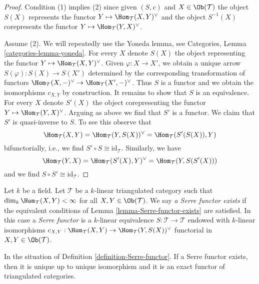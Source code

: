 \begin{proof}
Condition (1) implies (2) since given $(S, c)$ and $X \in \Ob(\mathcal{T})$
the object $S(X)$ represents the functor
$Y \mapsto \Hom_\mathcal{T}(X, Y)^\vee$ and the object $S^{-1}(X)$ corepresents
the functor $Y \mapsto \Hom_\mathcal{T}(Y, X)^\vee$.

\medskip\noindent
Assume (2). We will repeatedly use the Yoneda lemma, see
Categories, Lemma \ref{categories-lemma-yoneda}.
For every $X$ denote $S(X)$ the object representing the
functor $Y \mapsto \Hom_\mathcal{T}(X, Y)^\vee$. Given
$\varphi : X \to X'$, we obtain a unique arrow $S(\varphi) : S(X) \to S(X')$
determined by the corresponding transformation of functors
$\Hom_\mathcal{T}(X, -)^\vee \to \Hom_\mathcal{T}(X', -)^\vee$.
Thus $S$ is a functor and we obtain the isomorphisms $c_{X, Y}$
by construction. It remains to show that $S$ is an equivalence.
For every $X$ denote $S'(X)$ the object corepresenting the
functor $Y \mapsto \Hom_\mathcal{T}(Y, X)^\vee$. Arguing as
above we find that $S'$ is a functor. We claim that $S'$
is quasi-inverse to $S$. To see this observe that
$$
\Hom_\mathcal{T}(X, Y) = \Hom_\mathcal{T}(Y, S(X))^\vee =
\Hom_\mathcal{T}(S'(S(X)), Y)
$$
bifunctorially, i.e., we find $S' \circ S \cong \text{id}_\mathcal{T}$.
Similarly, we have
$$
\Hom_\mathcal{T}(Y, X) = \Hom_\mathcal{T}(S'(X), Y)^\vee =
\Hom_\mathcal{T}(Y, S(S'(X)))
$$
and we find $S \circ S' \cong \text{id}_\mathcal{T}$.
\end{proof}

\begin{definition}
\label{definition-Serre-functor}
Let $k$ be a field. Let $\mathcal{T}$ be a $k$-linear
triangulated category such that $\dim_k \Hom_\mathcal{T}(X, Y) < \infty$
for all $X, Y \in \Ob(\mathcal{T})$. We say {\it a Serre functor
exists} if the equivalent conditions of Lemma \ref{lemma-Serre-functor-exists}
are satisfied. In this case a {\it Serre functor} is a $k$-linear equivalence
$S : \mathcal{T} \to \mathcal{T}$ endowed with $k$-linear isomorphisms
$c_{X, Y} : \Hom_\mathcal{T}(X, Y) \to \Hom_\mathcal{T}(Y, S(X))^\vee$
functorial in $X, Y \in \Ob(\mathcal{T})$.
\end{definition}

\begin{lemma}
\label{lemma-Serre-functor}
In the situation of Definition \ref{definition-Serre-functor}.
If a Serre functor exists, then it is unique up to unique isomorphism and
it is an exact functor of triangulated categories.
\end{lemma}


